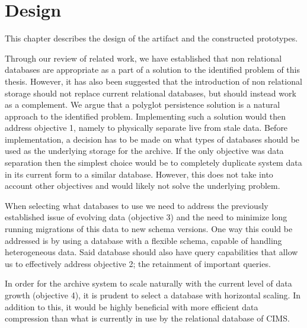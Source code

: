 \chapter{Design}
\label{chap:design}


This chapter describes the design of the artifact and the constructed prototypes.

Through our review of related work, we have established that non relational databases are appropriate as a part of a solution to the identified problem of this thesis. However, it has also been suggested \cite{NoSQLSurvey} that the introduction of non relational storage should not replace current relational databases, but should instead work as a complement. We argue that a polyglot persistence solution is a natural approach to the identified problem. Implementing such a solution would then address objective 1, namely to physically separate live from stale data. Before implementation, a decision has to be made on what types of databases should be used as the underlying storage for the archive. If the only objective was data separation then the simplest choice would be to completely duplicate system data in its current form to a similar database. However, this does not take into account other objectives and would likely not solve the underlying problem. 

When selecting what databases to use we need to address the previously established issue of evolving data (objective 3) and the need to minimize long running migrations of this data to new schema versions. One way this could be addressed is by using a database with a flexible schema, capable of handling heterogeneous data. Said database should also have query capabilities that allow us to effectively address objective 2; the retainment of important queries.

In order for the archive system to scale naturally with the current level of data growth (objective 4), it is prudent to select a database with horizontal scaling. In addition to this, it would be highly beneficial with more efficient data compression than what is currently in use by the relational database of CIMS.

